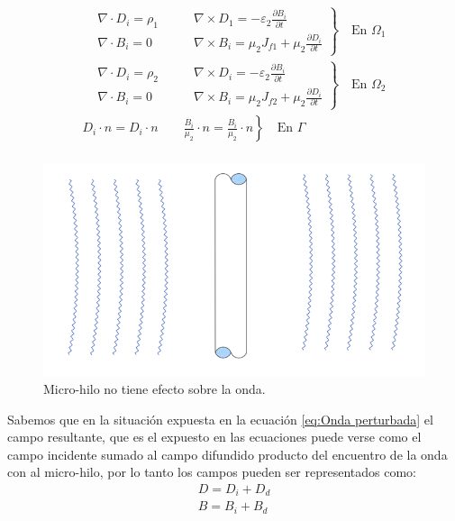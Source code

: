 \documentclass[11pt]{article}
\begin{document}
\begin{equation}
\label{eq:Onda no afectada}
\begin{split}
\left.
\begin{aligned}
&\nabla\cdot D_i = \rho_1\qquad & \nabla\times D_1 = -\varepsilon_2\frac{\partial B_i}{\partial t}\\
&\nabla\cdot B_i = 0\qquad & \nabla\times B_i = \mu_2 J_{f1}+\mu_2\frac{\partial D_i}{\partial t}
\end{aligned}
\right\}
\quad\text{En }\Omega_1\\
\left.
\begin{aligned}
&\nabla\cdot D_i = \rho_2\qquad & \nabla\times D_i = -\varepsilon_2\frac{\partial B_i}{\partial t}\\
&\nabla\cdot B_i = 0\qquad & \nabla\times B_i = \mu_2 J_{f2}+\mu_2\frac{\partial D_i}{\partial t}
\end{aligned}
\right\}
\quad\text{En }\Omega_2\\
\left. 
D_i\cdot n=D_i\cdot n \qquad \frac{B_i}{\mu_2}\cdot n=\frac{B_i}{\mu_2}\cdot n
\right\}
\quad\text{En }\Gamma\\
\end{split}
\end{equation}
\begin{figure}[H]
\centering
\includegraphics[width=16cm]{Imagenes/ondaincidente2.png}
\caption{Micro-hilo no tiene efecto sobre la onda.}\label{fig:Onda no afectada}
\end{figure}
Sabemos que en la situación expuesta en la ecuación \eqref{eq:Onda perturbada} el campo resultante, que es el expuesto en las ecuaciones puede verse como el campo incidente sumado al campo difundido producto del encuentro de la onda con al micro-hilo, por lo tanto los campos pueden ser representados como:
\begin{equation}
\label{eq:Descomposicion campos}
\begin{split}
D=D_i+D_d\\
B=B_i+B_d
\end{split}
\end{equation}
\end{document}
